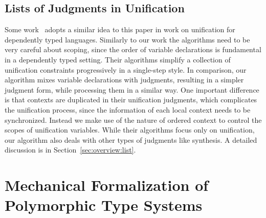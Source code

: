 
\subsection{Lists of Judgments in Unification}
Some work~\citep{Reed2009,Abel2011higher} adopts a similar idea to this paper
in work on unification for dependently typed languages. Similarly to our work
the algorithms need to be very careful about scoping, since the order of variable
declarations is fundamental in a dependently typed setting. 
Their algorithms simplify a collection of unification constraints progressively in a single-step style.
In comparison, our algorithm mixes variable declarations with judgments,
resulting in a simpler judgment form,
while processing them in a similar way.
One important difference is that contexts are
duplicated in their unification judgments, which complicates the unification process,
since the information of each local context needs to be synchronized.
Instead we make use of the nature of ordered context to control the scopes of unification variables.
While their algorithms focus only on unification,
our algorithm also deals with other types of judgments like synthesis.
A detailed discussion is in Section~\ref{sec:overview:list}.





\section{Mechanical Formalization of Polymorphic Type Systems}


